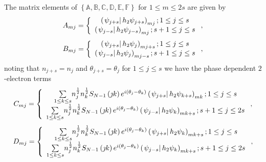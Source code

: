 \documentclass[aps,preprint]{revtex4}%
\begin{document}
The matrix elements of $\left\{  \mathbb{A},\mathbb{B},\mathbb{C}%
,\mathbb{D},\mathbb{E},\mathbb{F}\right\}  $ for $1\leq m\leq2s$ are given by
\begin{equation}
A_{mj}=\left\{
\begin{array}
[c]{c}%
\left(  \left.  \psi_{j+s}\right\vert h_{2}\psi_{j+s}\right)  _{mj};1\leq
j\leq s\\
\left(  \left.  \psi_{j-s}\right\vert h_{2}\psi_{j-s}\right)  _{mj};s+1\leq
j\leq s
\end{array}
\right.  ,
\end{equation}%
\begin{equation}
B_{mj}=\left\{
\begin{array}
[c]{c}%
\left(  \left.  \psi_{j+s}\right\vert h_{2}\psi_{j}\right)  _{mj+s};1\leq
j\leq s\\
\left(  \left.  \psi_{j-s}\right\vert h_{2}\psi_{j}\right)  _{mj-s};s+1\leq
j\leq s
\end{array}
\right.  ,
\end{equation}
noting that $n_{j+s}=n_{j}$ and $\theta_{j+s}=\theta_{j}$ for $1\leq j\leq s$
we have the phase dependent $2$-electron terms
\begin{equation}
C_{mj}=\left\{
\begin{array}
[c]{c}%
{\textstyle\sum\limits_{1\leq k\leq s}}
n_{j}^{\frac{1}{2}}n_{k}^{\frac{1}{2}}S_{N-1}\left(  \jmath k\right)
e^{i\left(  \theta_{j}-\theta_{k}\right)  }\left(  \left.  \psi_{j+s}%
\right\vert h_{2}\psi_{k+s}\right)  _{mk};1\leq j\leq s\\%
{\textstyle\sum\limits_{1\leq k\leq s}}
n_{j}^{\frac{1}{2}}n_{k}^{\frac{1}{2}}S_{N-1}\left(  \jmath k\right)
e^{i\left(  \theta_{j}-\theta_{k}\right)  }\left(  \left.  \psi_{j-s}%
\right\vert h_{2}\psi_{k}\right)  _{mk+s};s+1\leq j\leq2s
\end{array}
\right.  ,
\end{equation}%
\begin{equation}
D_{mj}=\left\{
\begin{array}
[c]{c}%
{\textstyle\sum\limits_{1\leq k\leq s}}
n_{j}^{\frac{1}{2}}n_{k}^{\frac{1}{2}}S_{N-1}\left(  \jmath k\right)
e^{i\left(  \theta_{j}-\theta_{k}\right)  }\left(  \left.  \psi_{j+s}%
\right\vert h_{2}\psi_{k}\right)  _{mk+s};1\leq j\leq s\\%
{\textstyle\sum\limits_{1\leq k\leq s}}
n_{j}^{\frac{1}{2}}n_{k}^{\frac{1}{2}}S_{N-1}\left(  \jmath k\right)
e^{i\left(  \theta_{j}-\theta_{k}\right)  }\left(  \left.  \psi_{j-s}%
\right\vert h_{2}\psi_{k}\right)  _{mk+s};s+1\leq j\leq2s
\end{array}
\right.  ,
\end{equation}
\end{document}
